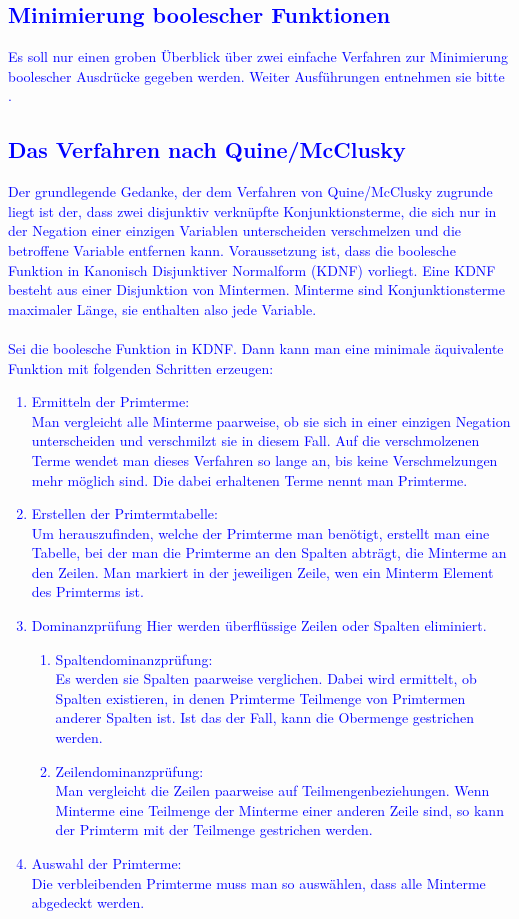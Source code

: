 \documentclass[a4paper, 11pt]{book}
\begin{document}
\textcolor{blue}{
	\chapter{Minimierung boolescher Funktionen} \label{Minimierung}
	Es soll nur einen groben Überblick über zwei einfache Verfahren zur Minimierung boolescher Ausdrücke gegeben werden. Weiter Ausführungen entnehmen sie bitte \cite{G01}.
	\section{Das Verfahren nach Quine/McClusky} \label{Min_QMC} 
	Der grundlegende Gedanke, der dem Verfahren von Quine/McClusky zugrunde liegt ist der, dass zwei disjunktiv verknüpfte  Konjunktionsterme, die sich nur in der Negation einer einzigen Variablen unterscheiden verschmelzen und die betroffene Variable entfernen kann. Voraussetzung ist, dass die boolesche Funktion in Kanonisch Disjunktiver Normalform (KDNF) vorliegt. Eine KDNF besteht aus einer Disjunktion von Mintermen. Minterme sind Konjunktionsterme maximaler Länge, sie enthalten also jede Variable.\\
	\\
	Sei die boolesche Funktion in KDNF. Dann kann man eine minimale äquivalente Funktion mit folgenden Schritten erzeugen:
	\begin{enumerate}
		\item Ermitteln der Primterme:\\
		Man vergleicht alle Minterme paarweise, ob sie sich in einer einzigen Negation unterscheiden und verschmilzt sie in diesem Fall. Auf die verschmolzenen Terme wendet man dieses Verfahren so lange an, bis keine Verschmelzungen mehr möglich sind. Die dabei erhaltenen Terme nennt man Primterme.
		\item Erstellen der Primtermtabelle:\\
		Um herauszufinden, welche der Primterme man benötigt, erstellt man eine Tabelle, bei der man die Primterme an den Spalten abträgt, die Minterme an den Zeilen. Man markiert in der jeweiligen Zeile, wen ein Minterm Element des Primterms ist.
		\item Dominanzprüfung
		Hier werden überflüssige Zeilen oder Spalten eliminiert. 
		\begin{enumerate}
			\item Spaltendominanzprüfung:\\
			Es werden sie Spalten paarweise verglichen. Dabei wird ermittelt, ob Spalten existieren, in denen Primterme Teilmenge von Primtermen anderer Spalten ist. Ist das der Fall, kann die Obermenge gestrichen werden. 
			\item Zeilendominanzprüfung:\\
			Man vergleicht die Zeilen paarweise auf Teilmengenbeziehungen. Wenn Minterme eine Teilmenge der Minterme einer anderen Zeile sind, so kann der Primterm mit der Teilmenge gestrichen werden. 
		\end{enumerate}
		\item Auswahl der Primterme:\\
		Die verbleibenden Primterme muss man so auswählen, dass alle Minterme abgedeckt werden. 
	\end{enumerate}
}
\end{document}
